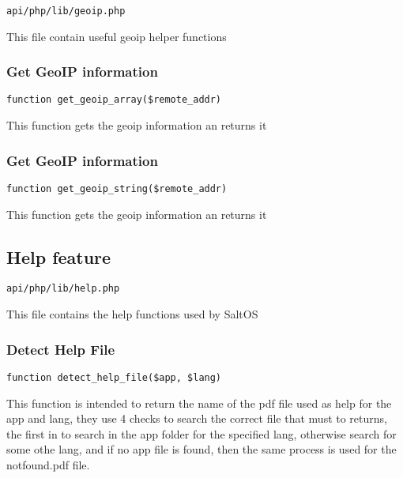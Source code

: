 \documentclass[a4paper]{article}
\begin{document}
\begin{lstlisting}
api/php/lib/geoip.php
\end{lstlisting}

This file contain useful geoip helper functions

\hypertarget{toc458}{}
\subsubsection{Get GeoIP information}

\begin{lstlisting}
function get_geoip_array($remote_addr)
\end{lstlisting}

This function gets the geoip information an returns it

\hypertarget{toc459}{}
\subsubsection{Get GeoIP information}

\begin{lstlisting}
function get_geoip_string($remote_addr)
\end{lstlisting}

This function gets the geoip information an returns it

\hypertarget{toc460}{}
\subsection{Help feature}

\begin{lstlisting}
api/php/lib/help.php
\end{lstlisting}

This file contains the help functions used by SaltOS

\hypertarget{toc461}{}
\subsubsection{Detect Help File}

\begin{lstlisting}
function detect_help_file($app, $lang)
\end{lstlisting}

This function is intended to return the name of the pdf file used as help
for the app and lang, they use 4 checks to search the correct file that must
to returns, the first in to search in the app folder for the specified lang,
otherwise search for some othe lang, and if no app file is found, then the
same process is used for the notfound.pdf file.
\end{document}
